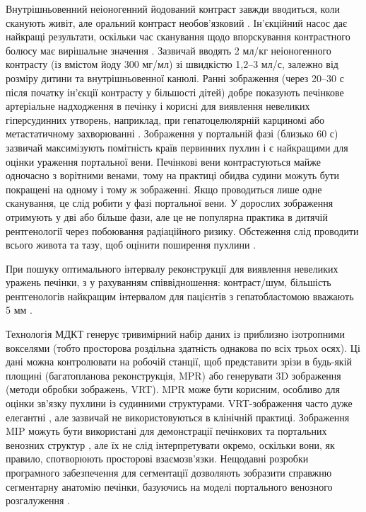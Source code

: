 Внутрішньовенний неіоногенний йодований контраст завжди вводиться, коли сканують живіт, але оральний контраст необов’язковий \cite{pmid17208562}. Ін'єкційний насос дає найкращі результати, оскільки час сканування щодо впорскування контрастного болюсу має вирішальне значення \cite{pmid16794509}. Зазвичай вводять 2 мл/кг неіоногенного контрасту (із вмістом йоду 300 мг/мл) зі швидкістю 1,2–3 мл/с, залежно від розміру дитини та внутрішньовенної канюлі. Ранні зображення (через 20–30 с після початку ін’єкції контрасту у більшості дітей) добре показують печінкове артеріальне надходження в печінку і корисні для виявлення невеликих гіперсудинних утворень, наприклад, при гепатоцелюлярній карциномі або метастатичному захворюванні \cite{pmid17430157}. Зображення у портальній фазі (близько 60 с) зазвичай максимізують помітність країв первинних пухлин і є найкращими для оцінки ураження портальної вени. Печінкові вени контрастуються майже одночасно з ворітними венами, тому на практиці обидва судини можуть бути покращені на одному і тому ж зображенні. Якщо проводиться лише одне сканування, це слід робити у фазі портальної вени. У дорослих зображення отримують у дві або більше фази, але це не популярна практика в дитячій рентгенології через побоювання радіаційного ризику. Обстеження слід проводити всього живота та тазу, щоб оцінити поширення пухлини \cite{pmid17208562}.

При пошуку оптимального інтервалу реконструкції для виявлення невеликих уражень печінки, з у рахуванням співвідношення: контраст/шум, більшість рентгенологів  найкращим інтервалом для пацієнтів з гепатобластомою вважають 5 мм \cite{pmid17661341}.

Технологія МДКТ генерує тривимірний набір даних із приблизно ізотропними вокселями (тобто просторова роздільна здатність однакова по всіх трьох осях). Ці дані можна контролювати на робочій станції, щоб представити зрізи в будь-якій площині (багатопланова реконструкція, MPR) або генерувати 3D зображення (методи обробки зображень, VRT). MPR може бути корисним, особливо для оцінки зв'язку пухлини із судинними структурами. VRT-зображення часто дуже елегантні \cite{pmid18444949}, але зазвичай не використовуються в клінічній практиці. Зображення MIP можуть бути використані для демонстрації печінкових та портальних венозних структур \cite{pmid18560935}, але їх не слід інтерпретувати окремо, оскільки вони, як правило, спотворюють просторові взаємозв'язки. Нещодавні розробки програмного забезпечення для сегментації дозволяють зобразити справжню сегментарну анатомію печінки, базуючись на моделі портального венозного розгалуження \cite{pmid18970927}.

